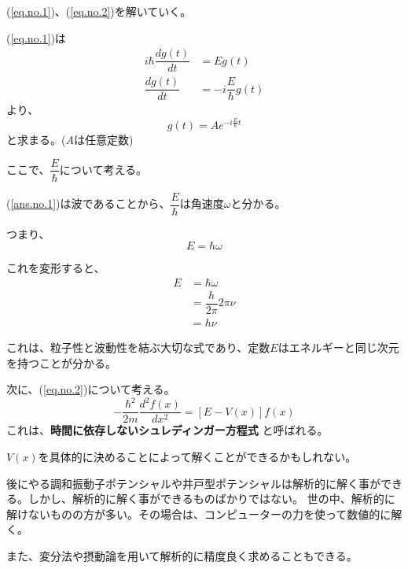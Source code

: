 	(\ref{eq.no.1})、(\ref{eq.no.2})を解いていく。

	(\ref{eq.no.1})は
	\begin{align}
	  i\hbar \dfrac{d g(t)}{d t} &= Eg(t) \\
	  \dfrac{d g(t)}{d t} &= -i \dfrac{E}{\hbar} g(t)
	\end{align}
	より、
	\begin{equation}
	  \label{ans.no.1}
	  \displaystyle g(t) = Ae^{-i \frac{E}{\hbar} t}
	\end{equation}
	と求まる。($A$は任意定数)

	ここで、$\dfrac{E}{\hbar}$について考える。

	(\ref{ans.no.1})は波であることから、$\dfrac{E}{\hbar}$は角速度$\omega$と分かる。

	つまり、
	\begin{equation}
	  E = \hbar \omega
	\end{equation}

	これを変形すると、
	\begin{align}
	  E &= \hbar \omega \\
	    &= \dfrac{h}{2\pi} 2\pi \nu \\
	    &= h\nu
	\end{align}

	これは、粒子性と波動性を結ぶ大切な式であり、定数$E$はエネルギーと同じ次元を持つことが分かる。

	次に、(\ref{eq.no.2})について考える。
	\begin{equation*}
		\label{time_independent_schrodinger_eq}
		- \dfrac{\hbar^2}{2m} \dfrac{d^2 f(x)}{d x^2} = [ E-V(x) ]f(x)
	\end{equation*}
	これは、{\bf 時間に依存しないシュレディンガー方程式} と呼ばれる。

	$V(x)$を具体的に決めることによって解くことができるかもしれない。

	後にやる調和振動子ポテンシャルや井戸型ポテンシャルは解析的に解く事ができる。しかし、解析的に解く事ができるものばかりではない。
	世の中、解析的に解けないものの方が多い。その場合は、コンピューターの力を使って数値的に解く。
	
	また、変分法や摂動論を用いて解析的に精度良く求めることもできる。
